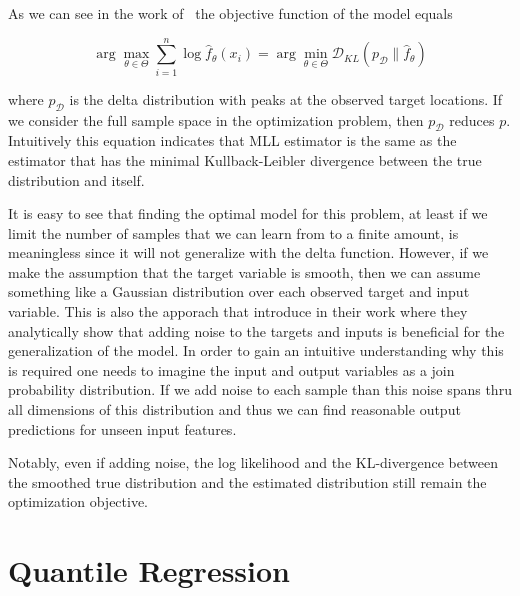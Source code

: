 As we can see in the work of~\cite{rothfuss2019noise} the objective function of the model equals

\begin{equation}
    \arg \max _{\theta \in \Theta} \sum_{i=1}^n \log
    \hat{f}_\theta\left(x_i\right)=\arg \min _{\theta \in \Theta}
    \mathcal{D}_{K
        L}\left(p_{\mathcal{D}} \| \hat{f}_\theta\right)
    \label{eq:kl_divergence_mll}
\end{equation}

where $p_{\mathcal{D}}$ is the delta distribution with peaks at the observed target locations. If we consider the full sample space in the optimization problem, then $p_{\mathcal{D}}$ reduces $p$. Intuitively this equation indicates that MLL estimator is the same as the estimator that has the minimal Kullback-Leibler divergence between the true distribution and itself.

It is easy to see that finding the optimal model for this problem, at least if we limit the number of samples that we can learn from to a finite amount, is meaningless since it will not generalize with the delta function. However, if we make the assumption that the target variable is smooth, then we can assume something like a Gaussian distribution over each observed target and input variable. This is also the apporach that \cite{rothfuss2019noise} introduce in their work where they analytically show that adding noise to the targets and inputs is beneficial for the generalization of the model. In order to gain an intuitive understanding why this is required one needs to imagine the input and output variables as a join probability distribution. If we add noise to each sample than this noise spans thru all dimensions of this distribution and thus we can find reasonable output predictions for unseen input features. %

Notably, even if adding noise, the log likelihood and the KL-divergence between the smoothed true distribution and the estimated distribution still remain the optimization objective. 

\section{Quantile Regression}\label{sec:qr}

